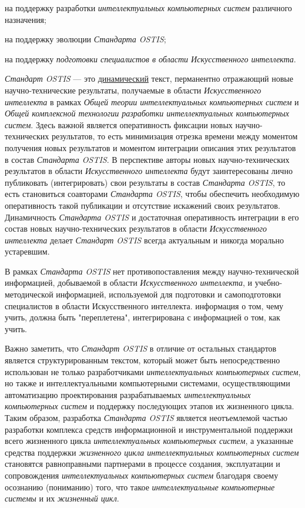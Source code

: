 \begin{textitemize}
	\item на поддержку разработки \textit{интеллектуальных компьютерных систем} различного назначения;
	\item на поддержку эволюции \textit{Стандарта OSTIS};
	\item на поддержку \textit{подготовки специалистов в области Искусственного интеллекта}.
\end{textitemize}

\textit{Стандарт OSTIS} --- это \uline{динамический} текст, перманентно отражающий новые научно-технические результаты, получаемые в области \textit{Искусственного интеллекта} в рамках \textit{Общей теории интеллектуальных компьютерных систем} и \textit{Общей комплексной технологии разработки интеллектуальных компьютерных систем}. Здесь важной является оперативность фиксации новых научно-технических результатов, то есть минимизация отрезка времени между моментом получения новых результатов и моментом интеграции описания этих результатов в состав \textit{Стандарта OSTIS}. В перспективе авторы новых научно-технических результатов в области \textit{Искусственного интеллекта} будут заинтересованы лично публиковать (интегрировать) свои результаты в состав \textit{Стандарта OSTIS}, то есть становиться соавторами \textit{Стандарта OSTIS}, чтобы обеспечить необходимую оперативность такой публикации и отсутствие искажений своих результатов. Динамичность \textit{Стандарта OSTIS} и достаточная оперативность интеграции в его состав новых научно-технических результатов в области \textit{Искусственного интеллекта} делает \textit{Стандарт OSTIS} всегда актуальным и никогда морально устаревшим.

В рамках \textit{Стандарта OSTIS} нет противопоставления между научно-технической информацией, добываемой в области \textit{Искусственного интеллекта}, и учебно-методической информацией, используемой для подготовки и самоподготовки специалистов в области Искусственного интеллекта. информация о том, чему учить, должна быть "переплетена"{}, интегрирована с информацией о том, как учить.

Важно заметить, что \textit{Стандарт OSTIS} в отличие от остальных стандартов является структурированным  текстом, который может быть непосредственно использован не только разработчиками \textit{интеллектуальных компьютерных систем}, но также и интеллектуальными компьютерными системами, осуществляющими автоматизацию проектирования разрабатываемых \textit{интеллектуальных компьютерных систем} и поддержку последующих этапов их жизненного цикла. Таким образом, разработка \textit{Стандарта OSTIS} является неотъемлемой частью разработки комплекса средств информационной и инструментальной поддержки всего жизненного цикла \textit{интеллектуальных компьютерных систем}, а указанные средства поддержки \textit{жизненного цикла интеллектуальных компьютерных систем} становятся равноправными партнерами в процессе создания, эксплуатации и сопровождения \textit{интеллектуальных компьютерных систем} благодаря своему осознанию (пониманию) того, что такое \textit{интеллектуальные компьютерные системы} и их \textit{жизненный цикл}.

